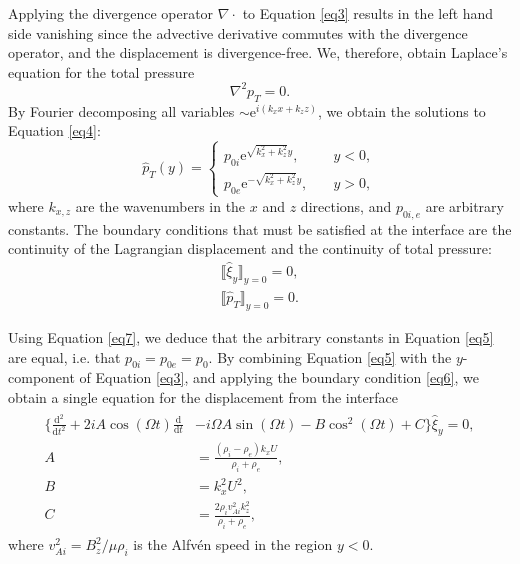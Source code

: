 \documentclass[12pt]{ociamthesis}
\begin{document}
Applying the divergence operator $\nabla \cdot$ to Equation \eqref{eq3} results in the left hand side vanishing since the advective derivative commutes with the divergence operator, and the displacement is divergence-free.
We, therefore, obtain Laplace's equation for the total pressure
\begin{equation}
\label{eq4}
\nabla^2 p_T = 0.
\end{equation}
By Fourier decomposing all variables $\sim \mathrm{e}^{i (k_x x + k_z z)}$, we obtain the solutions to Equation \eqref{eq4}:
\begin{equation}
\label{eq5}
\hat p_T(y) = 
\begin{cases}
p_{0 i} \mathrm{e}^{\sqrt{k_x^2 + k_z^2} y}, & \quad y < 0,
\\[0.3cm]
p_{0 e} \mathrm{e}^{-\sqrt{k_x^2 + k_z^2} y}, & \quad y > 0,
\end{cases}
\end{equation}
where $k_{x, z}$ are the wavenumbers in the $x$ and $z$ directions, and $p_{0i,e}$ are arbitrary constants.
The boundary conditions that must be satisfied at the interface are the continuity of the Lagrangian displacement and the continuity of total pressure:
\begin{align}
\label{eq6}
\llbracket \hat \xi_y \rrbracket_{y = 0} = 0,
\\[0.3cm]
\label{eq7}
\llbracket \hat p_T \rrbracket_{y = 0} = 0.
\end{align}

Using Equation \eqref{eq7}, we deduce that the arbitrary constants in Equation \eqref{eq5} are equal, i.e. that $p_{0 i} = p_{0 e} = p_0$.
By combining Equation \eqref{eq5} with the $y$-component of Equation \eqref{eq3}, and applying the boundary condition \eqref{eq6}, we obtain a single equation for the displacement from the interface
\begin{align}
\begin{split}
\label{eq8}
\bigg\{ \frac{\mathrm{d}^2}{\mathrm{d} t^2}
+ 2 i A \cos(\Omega t) \frac{\mathrm{d}}{\mathrm{d} t}
& - i \Omega A \sin(\Omega t)
- B \cos^2(\Omega t) 
+ C \bigg\} \hat \xi_y
= 0,
\\[0.3cm]
A & = \frac{(\rho_i - \rho_e) k_x U}{\rho_i + \rho_e},
\\[0.3cm]
B & = k_x^2 U^2,
\\[0.3cm]
C & = \frac{2 \rho_i v_{A i}^2 k_z^2}{\rho_i + \rho_e},
\end{split}
\end{align}
where $v_{Ai}^2 = B_z^2 / \mu \rho_i$ is the Alfv\'en speed in the region $y < 0$.
\end{document}
